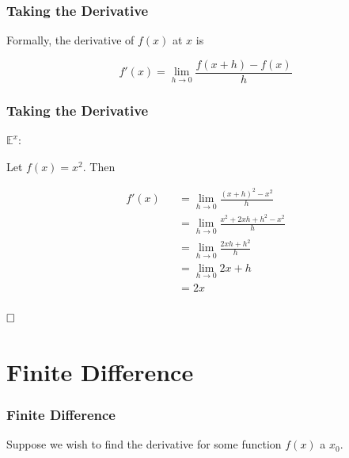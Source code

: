 \documentclass{beamer}
\def\qed{ \hspace*{\fill} \Box}
\begin{document}
\begin{frame}

  \frametitle{Taking the Derivative}

  Formally, the derivative of $f(x)$ at $x$ is

  \[ f'(x) = \lim_{h \to 0} \frac{f(x+h) - f(x)}{h} \]

\end{frame}

\begin{frame}

  \frametitle{Taking the Derivative}

  $\mathbb{E}^x$:

  Let $f(x) = x^2$. Then

  \begin{eqnarray*}
    f'(x) &&  = \lim_{h \to 0} \frac{(x+h)^2 - x^2}{h} \\
    && = \lim_{h \to 0} \frac{x^2 + 2xh + h^2 - x^2}{h} \\
    && = \lim_{h \to 0} \frac{2xh + h^2}{h} \\
    && = \lim_{h \to 0} 2x + h \\
    && = 2x \\
  \end{eqnarray*}

  $\qed$

\end{frame}

\section{Finite Difference}

\begin{frame}
\frametitle{Finite Difference}

Suppose we wish to find the derivative for some function $f(x)$ a $x_0$.

\pause {}

\end{frame}
\end{document}
